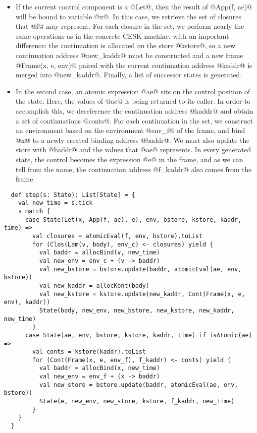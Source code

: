 \documentclass[acmsmall, screen]{acmart}\settopmatter{}
\begin{document}
\begin{itemize}
  \item If the current control component is a @Let@, then the result of @App(f, ae)@ will
    be bound to variable @x@. In this case, we retrieve the set of closures that @f@ may
    represent. For each closure in the set, we perform nearly the same operations as in the
    concrete CESK machine, with an important difference: the continuation is allocated on
    the store @kstore@, so a new continuation address @new_kaddr@ must be constructed and
    a new frame @Frame(x, e, env)@ paired with the current continuation address @kaddr@ is
    merged into @new_kaddr@. Finally, a list of successor states is generated.

  \item In the second case, an atomic expression @ae@ sits on the control position of the
    state. Here, the values of @ae@ is being returned to its caller.
    In order to accomplish this, we dereference the continuation address @kaddr@ and obtain
    a set of continuations @conts@. For each continuation in the set, we construct an
    environment based on the environment @env_f@ of the frame, and bind @x@ to a newly
    created binding address @baddr@. We must also update the store with @baddr@ and the
    values that @ae@ represents. In every generated state, the control becomes the expression
    @e@ in the frame, and as we can tell from the name, the continuation address @f_kaddr@
    also comes from the frame.
\end{itemize}

\begin{lstlisting}
  def step(s: State): List[State] = {
    val new_time = s.tick
    s match {
      case State(Let(x, App(f, ae), e), env, bstore, kstore, kaddr, time) =>
        val closures = atomicEval(f, env, bstore).toList
        for (Clos(Lam(v, body), env_c) <- closures) yield {
          val baddr = allocBind(v, new_time)
          val new_env = env_c + (v -> baddr)
          val new_bstore = bstore.update(baddr, atomicEval(ae, env, bstore))
          val new_kaddr = allocKont(body)
          val new_kstore = kstore.update(new_kaddr, Cont(Frame(x, e, env), kaddr))
          State(body, new_env, new_bstore, new_kstore, new_kaddr, new_time)
        }
      case State(ae, env, bstore, kstore, kaddr, time) if isAtomic(ae) =>
        val conts = kstore(kaddr).toList
        for (Cont(Frame(x, e, env_f), f_kaddr) <- conts) yield {
          val baddr = allocBind(x, new_time)
          val new_env = env_f + (x -> baddr)
          val new_store = bstore.update(baddr, atomicEval(ae, env, bstore))
          State(e, new_env, new_store, kstore, f_kaddr, new_time)
        }
    }
  }
\end{lstlisting}
\end{document}
